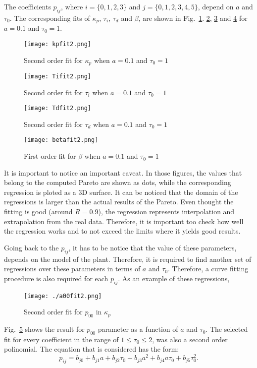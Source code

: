 The coefficients $p_{ij}$, where $i=\{0,1,2,3\}$ and $j=\{0,1,2,3,4,5\}$, depend on $a$ and $\tau_0$. The corresponding fits of $\kappa_p$, $\tau_i$, $\tau_d$ and $\beta$, are shown in Fig.~\ref{F:cftoolkp}. \ref{F:cftoolTi}, \ref{F:cftoolTd} and \ref{F:cftoolbeta} for $a=0.1$ and $\tau_{0}=1$.   %
%
\begin{figure}[tb]
	\centering
	\texttt{[image: kpfit2.png]}
	\caption{Second order fit for $\kappa_p$ when $a=0.1$ and $\tau_{0}=1$}
	\label{F:cftoolkp}
\end{figure}
%
\begin{figure}[tb]
	\centering
	\texttt{[image: Tifit2.png]}
	\caption{Second order fit for $\tau_i$ when $a=0.1$ and $\tau_0=1$}
	\label{F:cftoolTi}
\end{figure}
%
\begin{figure}[tb]
	\centering
	\texttt{[image: Tdfit2.png]}
	\caption{Second order fit for $\tau_d$ when $a=0.1$ and $\tau_0=1$}
	\label{F:cftoolTd}
\end{figure}
%
\begin{figure}[tb]
	\centering
	\texttt{[image: betafit2.png]}
	\caption{First order fit for $\beta$ when $a=0.1$ and $\tau_0=1$}
	\label{F:cftoolbeta}
\end{figure}

It is important to notice an important caveat. In those figures, the values that belong to the computed Pareto are shown as dots, while the corresponding regression is ploted as a 3D surface. It can be noticed that the domain of the regressions is larger than the actual results of the Pareto. Even thought the fitting is good (around $R=0.9$), the regression represents interpolation and extrapolation from the real data. Therefore, it is important too check how well the regression works and to not exceed the limits where it yields good results.

Going back to the $p_{ij}$, it has to be notice that the value of these parameters, depends on the model of the plant. Therefore, it is required to find another set of regressions over these parameters in terms of $a$ and $\tau_0$. Therefore, a curve fitting procedure is also required for each $p_{ij}$. As an example of these regressions, 
%
\begin{figure}[tb]
	\centering
	\texttt{[image: ./a00fit2.png]}
	\caption{Second order fit for $p_{00}$ in $\kappa_p$}
	\label{F:coeff}
\end{figure}
%
Fig.~\ref{F:coeff} shows the result for $p_{00}$ parameter as a function of $a$ and $\tau_0$. The selected fit for every coefficient in the range of $1\leq \tau_0 \leq2$, was also a second order polinomial. The equation that is considered has the form:
%
\begin{equation}
p_{ij} = b_{j0}+b_{j1}a+b_{j2} \tau_0+b_{j3}a^2+b_{j4}a \tau_0+b_{j5}\tau_0^2 .
\label{E:coeff}
\end{equation}

